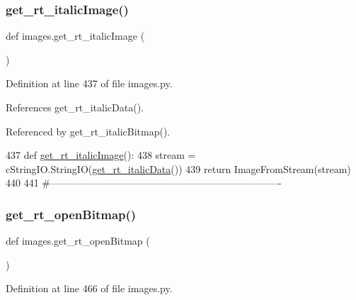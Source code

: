 \mbox{\label{namespaceimages_abb24502023e84e99516d15059c26371d}} 
\subsubsection{\texorpdfstring{get\+\_\+rt\+\_\+italic\+Image()}{get\_rt\_italicImage()}}
{\footnotesize\ttfamily def images.\+get\+\_\+rt\+\_\+italic\+Image (\begin{DoxyParamCaption}{ }\end{DoxyParamCaption})}



Definition at line 437 of file images.\+py.



References get\+\_\+rt\+\_\+italic\+Data().



Referenced by get\+\_\+rt\+\_\+italic\+Bitmap().


\begin{DoxyCode}
437 \textcolor{keyword}{def }\hyperlink{namespaceimages_abb24502023e84e99516d15059c26371d}{get\_rt\_italicImage}():
438     stream = cStringIO.StringIO(\hyperlink{namespaceimages_a912618bf10b2cb0da48f4e793c51fad0}{get\_rt\_italicData}())
439     \textcolor{keywordflow}{return} ImageFromStream(stream)
440 
441 \textcolor{comment}{#----------------------------------------------------------------------}
\end{DoxyCode}
\mbox{\label{namespaceimages_a81c594953339efc7f92c04aa49ba9d37}} 
\subsubsection{\texorpdfstring{get\+\_\+rt\+\_\+open\+Bitmap()}{get\_rt\_openBitmap()}}
{\footnotesize\ttfamily def images.\+get\+\_\+rt\+\_\+open\+Bitmap (\begin{DoxyParamCaption}{ }\end{DoxyParamCaption})}



Definition at line 466 of file images.\+py.



